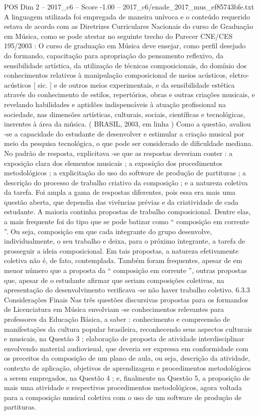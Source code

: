 \begin{textsample}{POS Dim 2 – 2017\_c6 – Score -1.00 – 2017\_c6/enade\_2017\_mus\_ef85743bfe.txt}
A linguagem utilizada foi empregada de maneira unívoca e o conteúdo requerido estava de acordo com as Diretrizes Curriculares Nacionais do curso de Graduação em Música, como se pode atestar no seguinte trecho do Parecer CNE/CES 195/2003 : O curso de graduação em Música deve ensejar, como perfil desejado do formando, capacitação para apropriação do pensamento reflexivo, da sensibilidade artística, da utilização de técnicas composicionais, do domínio dos conhecimentos relativos à manipulação composicional de meios acústicos, eletro-acústicos [ sic. ] e de outros meios experimentais, e da sensibilidade estética através do conhecimento de estilos, repertórios, obras e outras criações musicais, e revelando habilidades e aptidões indispensáveis à atuação profissional na sociedade, nas dimensões artísticas, culturais, sociais, científicas e tecnológicas, inerentes à área da música. ( BRASIL, 2003, em linha ) Como a questão, avaliou -se a capacidade do estudante de desenvolver e estimular a criação musical por meio da pesquisa tecnológica, o que pode ser considerado de dificuldade mediana.
No padrão de resposta, explicitava -se que as respostas deveriam conter : a exposição clara dos elementos musicais ; a exposição dos procedimentos metodológicos ; a explicitação do uso do software de produção de partituras ; a descrição do processo de trabalho criativo da composição ; e a natureza coletiva da tarefa.
Foi ampla a gama de respostas diferentes, pois essa era mais uma questão aberta, que dependia das vivências prévias e da criatividade de cada estudante.
A maioria continha propostas de trabalho composicional.
Dentre elas, a mais frequente foi do tipo que se pode batizar como “ composição em corrente ”.
Ou seja, composição em que cada integrante do grupo desenvolve, individualmente, o seu trabalho e deixa, para o próximo integrante, a tarefa de prosseguir a ideia composicional.
Em tais propostas, a natureza efetivamente coletiva não é, de fato, contemplada.
Também foram frequentes, apesar de em menor número que a proposta da “ composição em corrente ”, outras propostas que, apesar de o estudante afirmar que seriam composições coletivas, na apresentação do desenvolvimento verificava -se não haver trabalho coletivo. 6.3.3 Considerações Finais Nas três questões discursivas propostas para os formandos de Licenciatura em Música envolviam -se conhecimentos relevantes para professores da Educação Básica, a saber : conhecimento e compreensão de manifestações da cultura popular brasileira, reconhecendo seus aspectos culturais e musicais, na Questão 3 ; elaboração de proposta de atividade interdisciplinar envolvendo material audiovisual, que deveria ser expressa em conformidade com os preceitos da composição de um plano de aula, ou seja, descrição da atividade, contexto de aplicação, objetivos de aprendizagem e procedimentos metodológicos a serem empregados, na Questão 4 ; e, finalmente na Questão 5, a proposição de mais uma atividade e respectivos procedimentos metodológicos, agora voltada para a composição musical coletiva com o uso de um software de produção de partituras.

\end{textsample}

